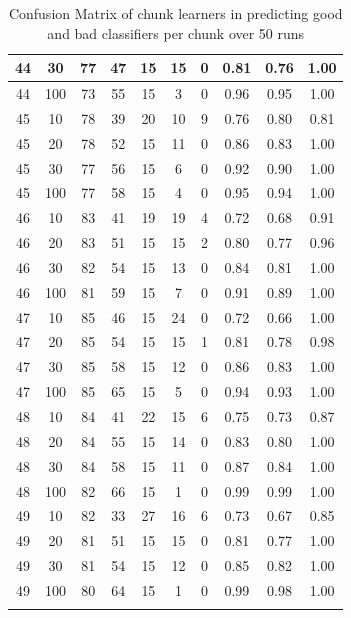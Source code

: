 \begin{longtable}{ |c|c|c|c|c|c|c|c|c|c| }
            44 & 30 & 77 & 47 & 15 & 15 & 0 & 0.81 & 0.76 & 1.00 \\ \hline
            44 & 100 & 73 & 55 & 15 & 3 & 0 & 0.96 & 0.95 & 1.00 \\ \hline
            45 & 10 & 78 & 39 & 20 & 10 & 9 & 0.76 & 0.80 & 0.81 \\ \hline
            45 & 20 & 78 & 52 & 15 & 11 & 0 & 0.86 & 0.83 & 1.00 \\ \hline
            45 & 30 & 77 & 56 & 15 & 6 & 0 & 0.92 & 0.90 & 1.00 \\ \hline
            45 & 100 & 77 & 58 & 15 & 4 & 0 & 0.95 & 0.94 & 1.00 \\ \hline
            46 & 10 & 83 & 41 & 19 & 19 & 4 & 0.72 & 0.68 & 0.91 \\ \hline
            46 & 20 & 83 & 51 & 15 & 15 & 2 & 0.80 & 0.77 & 0.96 \\ \hline
            46 & 30 & 82 & 54 & 15 & 13 & 0 & 0.84 & 0.81 & 1.00 \\ \hline
            46 & 100 & 81 & 59 & 15 & 7 & 0 & 0.91 & 0.89 & 1.00 \\ \hline
            47 & 10 & 85 & 46 & 15 & 24 & 0 & 0.72 & 0.66 & 1.00 \\ \hline
            47 & 20 & 85 & 54 & 15 & 15 & 1 & 0.81 & 0.78 & 0.98 \\ \hline
            47 & 30 & 85 & 58 & 15 & 12 & 0 & 0.86 & 0.83 & 1.00 \\ \hline
            47 & 100 & 85 & 65 & 15 & 5 & 0 & 0.94 & 0.93 & 1.00 \\ \hline
            48 & 10 & 84 & 41 & 22 & 15 & 6 & 0.75 & 0.73 & 0.87 \\ \hline
            48 & 20 & 84 & 55 & 15 & 14 & 0 & 0.83 & 0.80 & 1.00 \\ \hline
            48 & 30 & 84 & 58 & 15 & 11 & 0 & 0.87 & 0.84 & 1.00 \\ \hline
            48 & 100 & 82 & 66 & 15 & 1 & 0 & 0.99 & 0.99 & 1.00 \\ \hline
            49 & 10 & 82 & 33 & 27 & 16 & 6 & 0.73 & 0.67 & 0.85 \\ \hline
            49 & 20 & 81 & 51 & 15 & 15 & 0 & 0.81 & 0.77 & 1.00 \\ \hline
            49 & 30 & 81 & 54 & 15 & 12 & 0 & 0.85 & 0.82 & 1.00 \\ \hline
            49 & 100 & 80 & 64 & 15 & 1 & 0 & 0.99 & 0.98 & 1.00 \\ \hline
    \caption{Confusion Matrix of chunk learners in predicting good and bad classifiers per chunk over 50 runs}
\end{longtable}